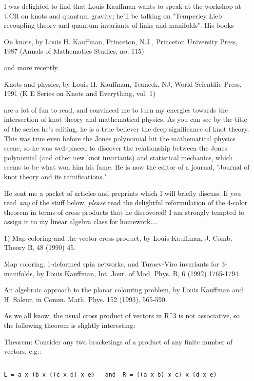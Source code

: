 

I was delighted to find that Louis Kauffman wants to speak at the
workshop at UCR on knots and quantum gravity; he'll be talking
on "Temperley Lieb recoupling theory and quantum invariants of links and
manifolds".    His books

On knots, by Louis H. Kauffman, Princeton, N.J., Princeton University
Press, 1987 (Annals of Mathematics Studies, no. 115)

and more recently

Knots and physics, by Louis H. Kauffman, Teaneck, NJ, World Scientific
Press, 1991 (K \text{\&}  E Series on Knots and Everything, vol. 1)

are a lot of fun to read, and convinced me to turn my energies
towards the intersection of knot theory and mathematical physics.  As
you can see by the title of the series he's editing, he is a true
believer the deep significance of knot theory.  This was true even
before the Jones polynomial hit the mathematical physics scene, so he
was well-placed to discover the relationship between the Jones
polynomial (and other new knot invariants) and statistical mechanics,
which seems to be what won him his fame.  He is now the editor of a
journal, "Journal of knot theory and its ramifications."  

He sent me a packet of articles and preprints which I will briefly
discuss.  If you read \emph{any} of the stuff below, \emph{please} read the
delightful reformulation of the 4-color theorem in terms of cross
products that he discovered!  I am strongly tempted to assign it to my
linear algebra class for homework....

1)  Map coloring and the vector cross product, by Louis Kauffman, J. Comb.
Theory B, 48 (1990) 45.

Map coloring, 1-deformed spin networks, and Turaev-Viro
invariants for 3-manifolds, by Louis Kauffman, Int. Jour. of Mod. Phys.
B, 6 (1992) 1765-1794. 

An algebraic approach to the planar colouring problem, by Louis Kauffman
and H. Saleur, in Comm. Math. Phys. 152 (1993), 565-590.

As we all know, the usual cross product of vectors in R^3 is not
associative, so the following theorem is slightly interesting:

Theorem: Consider any two bracketings of a product of any finite number
of vectors, e.g.:


\begin{verbatim}

L = a x (b x ((c x d) x e)   and  R = ((a x b) x c) x (d x e)
\end{verbatim}
    

